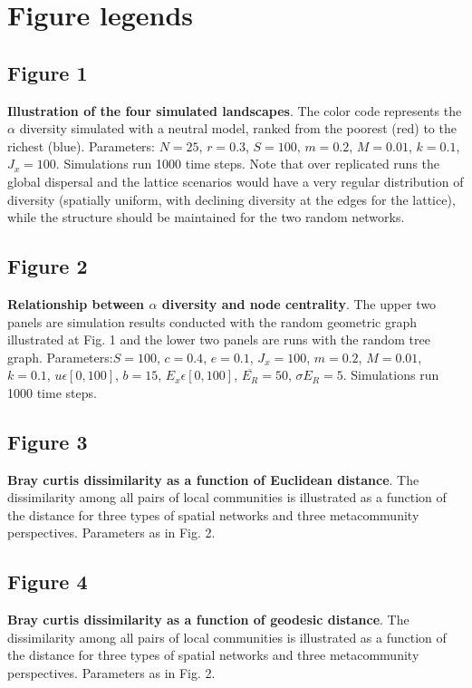 \documentclass[12pt]{article}
\begin{document}
\printbibliography

\newpage
\section*{Figure legends}

\subsection*{Figure 1}
\textbf{Illustration of the four simulated landscapes}. The color code
represents the $\alpha$ diversity simulated with a neutral model, ranked from
the poorest (red) to the richest (blue). Parameters: $N = 25$, $r = 0.3 $, $S =
100$, $m = 0.2$, $M = 0.01$, $k = 0.1$, $J_x = 100$. Simulations run 1000 time
steps. Note that over replicated runs the global dispersal and the lattice scenarios would have a very regular distribution of diversity (spatially uniform, with declining diversity at the edges for the lattice), while the structure should be maintained for the two random networks. 

\subsection*{Figure 2}
\textbf{Relationship between $\alpha$ diversity and node centrality}. The upper
two panels are simulation results conducted with the random geometric graph
illustrated at Fig. 1 and the lower two panels are runs with the random tree
graph. Parameters:$S = 100$, $c = 0.4$, $e = 0.1$, $J_x = 100$, $m = 0.2$, $M =
0.01$, $k = 0.1$, $ u \epsilon [0,100]$, $b = 15$, $ E_x \epsilon [0,100]$,
$\overline{E_R} = 50$, $\sigma{E_R} = 5$. Simulations run 1000 time steps.

\subsection*{Figure 3}
\textbf{Bray curtis dissimilarity as a function of Euclidean distance}. The dissimilarity among all pairs of local communities is illustrated as a function of the distance for three types of spatial networks and three metacommunity perspectives. Parameters as in Fig. 2.

\subsection*{Figure 4}
\textbf{Bray curtis dissimilarity as a function of geodesic distance}. The dissimilarity among all pairs of local communities is illustrated as a function of the distance for three types of spatial networks and three metacommunity perspectives. Parameters as in Fig. 2.
\end{document}
